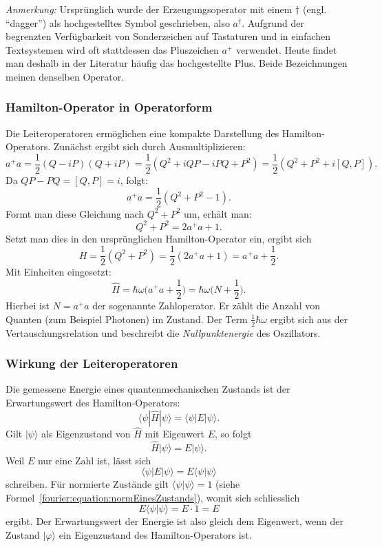 \noindent
\textit{Anmerkung:}
Ursprünglich wurde der Erzeugungsoperator mit einem $\dagger$ (engl. ``dagger'') als hochgestelltes Symbol geschrieben, also $a^\dagger$.
Aufgrund der begrenzten Verfügbarkeit von Sonderzeichen auf Tastaturen und in einfachen Textsystemen wird oft stattdessen das Pluszeichen $a^+$ verwendet.
Heute findet man deshalb in der Literatur häufig das hochgestellte Plus.
Beide Bezeichnungen meinen denselben Operator.

\subsubsection{Hamilton-Operator in Operatorform\label{fourier:subsubsection:HamiltonOperatorInOperatorform}}
Die Leiteroperatoren ermöglichen eine kompakte Darstellung des Hamilton-Operators.
Zunächst ergibt sich durch Ausmultiplizieren:
\[
	a^+a = \frac{1}{2}(Q - iP)(Q + iP) = \frac{1}{2}(Q^2 + iQP - iPQ + P^2) = \frac{1}{2}(Q^2 + P^2 + i[Q, P]).
\]
Da $QP - PQ = [Q, P] = i$, folgt:
\[
	a^+a = \frac{1}{2}(Q^2 + P^2 - 1).
\]
Formt man diese Gleichung nach $Q^2 + P^2$ um, erhält man:
\[
	Q^2 + P^2 = 2a^+a + 1.
\]
Setzt man dies in den ursprünglichen Hamilton-Operator ein, ergibt sich
\[
	H = \frac{1}{2}(Q^2 + P^2) = \frac{1}{2}(2a^+a + 1) = a^+a + \frac{1}{2}.
\]
Mit Einheiten eingesetzt:
\begin{equation}
	\hat{H} = \hbar\omega \biggl(a^+ a + \frac{1}{2}\biggr) = \hbar\omega \biggl(N + \frac{1}{2}\biggr).
\end{equation}
Hierbei ist $N = a^+a$ der sogenannte Zahloperator.
Er zählt die Anzahl von Quanten (zum Beispiel Photonen) im Zustand.
Der Term $\frac{1}{2}\hbar\omega$ ergibt sich aus der Vertauschungsrelation und beschreibt die \emph{Nullpunktenergie} des Oszillators.
%

\subsubsection{Wirkung der Leiteroperatoren\label{fourier:subsubsection:WirkungLeiteroperatoren}}
Die gemessene Energie eines quantenmechanischen Zustands ist der Erwartungswert des Hamilton-Operators:
\begin{equation}
	\langle\psi|\hat{H}|\psi\rangle = \langle\psi|E|\psi\rangle.
\end{equation}
Gilt $|\psi\rangle$ als Eigenzustand von $\hat{H}$ mit Eigenwert $E$, so folgt
\begin{equation}
	\hat{H}|\psi\rangle = E|\psi\rangle.
\end{equation}
Weil $E$ nur eine Zahl ist, lässt sich
\[
	\langle\psi|E|\psi\rangle = E \langle\psi|\psi\rangle
\]
schreiben.
Für normierte Zustände gilt $\langle\psi|\psi\rangle = 1$ (siehe Formel~\ref{fourier:equation:normEinesZustands}), womit sich schliesslich
\[
	E \langle\psi|\psi\rangle = E \cdot 1 = E
\]
ergibt.
Der Erwartungswert der Energie ist also gleich dem Eigenwert, wenn der Zustand $|\varphi\rangle$ ein Eigenzustand des Hamilton-Operators ist.

